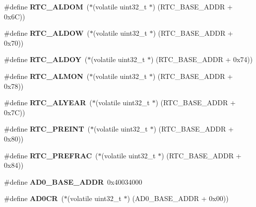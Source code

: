 \begin{DoxyCompactItemize}
\#define {\bfseries R\+T\+C\+\_\+\+A\+L\+D\+OM}~($\ast$(volatile uint32\+\_\+t $\ast$) (R\+T\+C\+\_\+\+B\+A\+S\+E\+\_\+\+A\+D\+DR + 0x6\+C))
\item 
\mbox{\label{group__lpc24xx__regs_gac042f6395814397b28e2682f899e0646}} 
\#define {\bfseries R\+T\+C\+\_\+\+A\+L\+D\+OW}~($\ast$(volatile uint32\+\_\+t $\ast$) (R\+T\+C\+\_\+\+B\+A\+S\+E\+\_\+\+A\+D\+DR + 0x70))
\item 
\mbox{\label{group__lpc24xx__regs_ga26830345067fee75f13598f6209991c7}} 
\#define {\bfseries R\+T\+C\+\_\+\+A\+L\+D\+OY}~($\ast$(volatile uint32\+\_\+t $\ast$) (R\+T\+C\+\_\+\+B\+A\+S\+E\+\_\+\+A\+D\+DR + 0x74))
\item 
\mbox{\label{group__lpc24xx__regs_ga881bade284f5e592494b1c61aaec7ce0}} 
\#define {\bfseries R\+T\+C\+\_\+\+A\+L\+M\+ON}~($\ast$(volatile uint32\+\_\+t $\ast$) (R\+T\+C\+\_\+\+B\+A\+S\+E\+\_\+\+A\+D\+DR + 0x78))
\item 
\mbox{\label{group__lpc24xx__regs_ga13dce75fb8b965e708f1d82b18fd787f}} 
\#define {\bfseries R\+T\+C\+\_\+\+A\+L\+Y\+E\+AR}~($\ast$(volatile uint32\+\_\+t $\ast$) (R\+T\+C\+\_\+\+B\+A\+S\+E\+\_\+\+A\+D\+DR + 0x7\+C))
\item 
\mbox{\label{group__lpc24xx__regs_ga49d9de46ffd09c6bb431d4b23eb89fa0}} 
\#define {\bfseries R\+T\+C\+\_\+\+P\+R\+E\+I\+NT}~($\ast$(volatile uint32\+\_\+t $\ast$) (R\+T\+C\+\_\+\+B\+A\+S\+E\+\_\+\+A\+D\+DR + 0x80))
\item 
\mbox{\label{group__lpc24xx__regs_ga468312de8a59df522a9d74fc9563134f}} 
\#define {\bfseries R\+T\+C\+\_\+\+P\+R\+E\+F\+R\+AC}~($\ast$(volatile uint32\+\_\+t $\ast$) (R\+T\+C\+\_\+\+B\+A\+S\+E\+\_\+\+A\+D\+DR + 0x84))
\item 
\mbox{\label{group__lpc24xx__regs_gacea72a246c6a7e09ffdbd4442148e0d0}} 
\#define {\bfseries A\+D0\+\_\+\+B\+A\+S\+E\+\_\+\+A\+D\+DR}~0x40034000
\item 
\mbox{\label{group__lpc24xx__regs_ga1d72c55d1ed959fe28600b4a521cefbd}} 
\#define {\bfseries A\+D0\+CR}~($\ast$(volatile uint32\+\_\+t $\ast$) (A\+D0\+\_\+\+B\+A\+S\+E\+\_\+\+A\+D\+DR + 0x00))

\end{DoxyCompactItemize}

